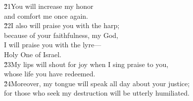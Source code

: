 \begin{poetry}
\poeml \v{21}You will increase my honor \\
\poemll    and comfort me once again. \\
\poeml \v{22}I also will praise you with the harp; \\
\poemll    because of your faithfulness, my God, \\
\poeml I will praise you with the lyre--- \\
\poemll    Holy One of Israel. \\
\poeml \v{23}My lips will shout for joy when I sing praise to you, \\
\poemll    whose life you have redeemed. \\
\poeml \v{24}Moreover, my tongue will speak all day about your justice; \\
\poemll    for those who seek my destruction will be utterly humiliated.
\end{poetry}


